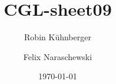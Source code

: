 \documentclass{scrartcl}
\title{CGL-sheet09}
\author[1]{Robin Kühnberger}
\author[2]{Felix Naraschewski}
\affil[1]{University Stuttgart}
\affil[2]{University Stuttgart}
\date{\today}
\begin{document}
\maketitle
\tableofcontents

\section{}


%
%

\listoffigures
\end{document}
